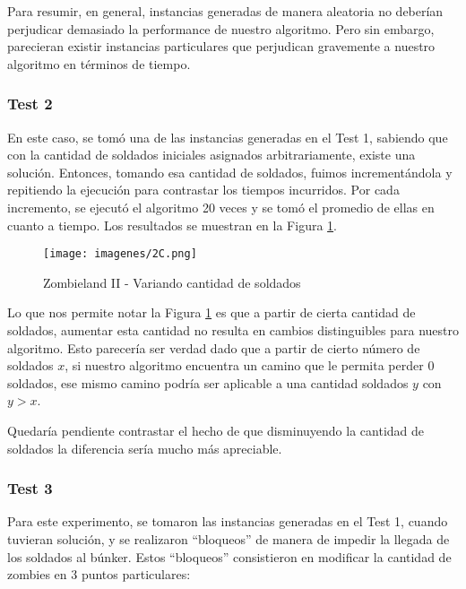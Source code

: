 Para resumir, en general, instancias generadas de manera aleatoria no deberían perjudicar demasiado la performance de nuestro algoritmo. Pero sin embargo, parecieran existir instancias particulares que perjudican gravemente a nuestro algoritmo en términos de tiempo.

\vspace*{0.6cm}

\subsubsection{Test 2}

En este caso, se tomó una de las instancias generadas en el Test 1, sabiendo que con la cantidad de soldados iniciales asignados arbitrariamente, existe una solución.  Entonces, tomando esa cantidad de soldados, fuimos incrementándola y repitiendo la ejecución para contrastar los tiempos incurridos.  Por cada incremento, se ejecutó el algoritmo 20 veces y se tomó el promedio de ellas en cuanto a tiempo.  Los resultados se muestran en la Figura \ref{fig:2B}.

\begin{figure}[htb]
	\begin{center}
    		\texttt{[image: imagenes/2C.png]}
	\end{center}
	\caption{Zombieland II - Variando cantidad de soldados}\label{fig:2B}
\end{figure}

Lo que nos permite notar la Figura \ref{fig:2B} es que a partir de cierta cantidad de soldados, aumentar esta cantidad no resulta en cambios distinguibles para nuestro algoritmo. Esto parecería ser verdad dado que a partir de cierto número de soldados $x$, si nuestro algoritmo encuentra un camino que le permita perder 0 soldados, ese mismo camino podría ser aplicable a una cantidad soldados $y$ con $y>x$.

Quedaría pendiente contrastar el hecho de que disminuyendo la cantidad de soldados la diferencia sería mucho más apreciable.

\subsubsection{Test 3}
Para este experimento, se tomaron las instancias generadas en el Test 1, cuando tuvieran solución, y se realizaron ``bloqueos'' de manera de impedir la llegada de los soldados al búnker.  Estos ``bloqueos'' consistieron en modificar la cantidad de zombies en 3 puntos particulares:

